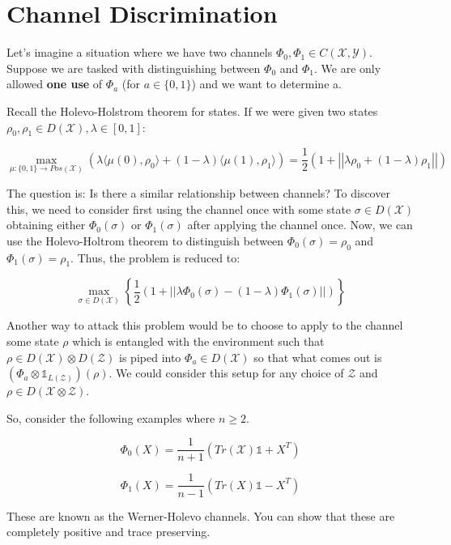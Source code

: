 \documentclass{article}
\begin{document}
\section*{Channel Discrimination}
Let's imagine a situation where we have two channels $\Phi_0, \Phi_1 \in
C(\mathcal{X},\mathcal{Y})$. Suppose we are tasked with distinguishing between
$\Phi_0$ and $\Phi_1$. We are only allowed \textbf{one use} of $\Phi_a$ (for $a
\in \{0,1\}$) and we want to determine a.

Recall the Holevo-Holstrom theorem for states. If we were given two states
$\rho_0,\rho_1 \in D(\mathcal{X}), \lambda \in [0,1]$:

\[ 
    \max_{\mu : \{0,1\} \rightarrow Pos(\mathcal{X})} \left( \lambda \langle \mu(0) , \rho_0 \rangle + \left( 1-\lambda
\right) \langle \mu(1) , \rho_1 \rangle  \right) = \frac{1}{2} \left( 1 + \left|
\left| \lambda \rho_0 + \left( 1-\lambda \right) \rho_1 \right|\right| \right) 
\]

The question is: Is there a similar relationship between channels? To discover
this, we need to consider first using the channel once with some state $\sigma
\in D(\mathcal{X})$ obtaining either $\Phi_0(\sigma)$ or $\Phi_1(\sigma)$ after
applying the channel once. Now, we can use the Holevo-Holtrom theorem to
distinguish between $\Phi_0(\sigma) = \rho_0$ and $ \Phi_1(\sigma) = \rho_1 $.
Thus, the problem is reduced to:

\[ 
    \max_{\sigma \in D(\mathcal{X})} \left\{ \frac{1}{2} \left( 1 + \left| \left|
    \lambda \Phi_0(\sigma) - (1-\lambda) \Phi_1(\sigma) \right| \right| \right) \right\} 
\]

Another way to attack this problem would be to choose to apply to the channel
some state $\rho$ which is entangled with the environment such that $\rho \in
D(\mathcal{X}) \otimes D(\mathcal{Z})$ is piped into $\Phi_a \in D(\mathcal{X})$
so that what comes out is $ \left( \Phi_a \otimes \mathds{1}_{L(\mathcal{Z})}
\right) (\rho) $. We could consider this setup for any choice of $\mathcal{Z}$
and $\rho \in D(\mathcal{X} \otimes \mathcal{Z})$.

So, consider the following examples where $n \ge 2$.

\[
    \Phi_0(X)= \frac{1}{n+1} \left( Tr(\mathcal{X})\mathds{1} + X^T \right)
\]

\[ 
    \Phi_1(X) = \frac{1}{n-1} \left( Tr(X)\mathds{1} - X^T \right)
\]

These are known as the Werner-Holevo channels. You can show that these are
completely positive and trace preserving.
\end{document}
